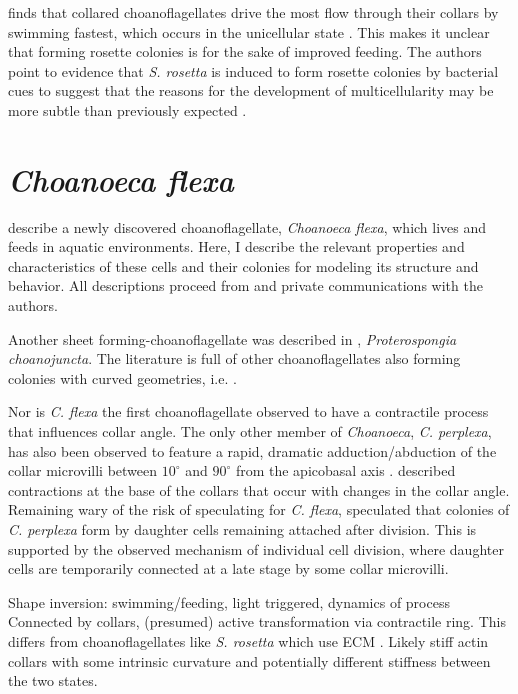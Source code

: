 \citet{kirkegaard2016} finds that collared choanoflagellates drive the most flow through their collars by swimming fastest, which occurs in the unicellular state \citep{michelin2011}. This makes it unclear that forming rosette colonies is for the sake of improved feeding. The authors point to evidence that \textit{S. rosetta} is induced to form rosette colonies by bacterial cues to suggest that the reasons for the development of multicellularity may be more subtle than previously expected \citep{alegado2012}.

\section{\textit{Choanoeca flexa}}  %

\citet{brunet2019} describe a newly discovered choanoflagellate, \textit{Choanoeca flexa}, which lives and feeds in aquatic environments. Here, I describe the relevant properties and characteristics of these cells and their colonies for modeling its structure and behavior. All descriptions proceed from \citet{brunet2019} and private communications with the authors.

Another sheet forming-choanoflagellate was described in \citet{leadbeater1983}, \textit{Proterospongia choanojuncta}. The literature is full of other choanoflagellates also forming colonies with curved geometries, i.e. \citet{lauterborn1898}. 

Nor is \textit{C. flexa} the first choanoflagellate observed to have a contractile process that influences collar angle. The only other member of \textit{Choanoeca}, \textit{C. perplexa}, has also been observed to feature a rapid, dramatic adduction/abduction of the collar microvilli between $10^\circ$ and $90^\circ$ from the apicobasal axis \citep{ellis1930}. \citet{leadbeater1977} described contractions at the base of the collars that occur with changes in the collar angle.
Remaining wary of the risk of speculating for \textit{C. flexa}, \citet{leadbeater1977} speculated that colonies of \textit{C. perplexa} form by daughter cells remaining attached after division. This is supported by the observed mechanism of individual cell division, where daughter cells are temporarily connected at a late stage by some collar microvilli. 

Shape inversion: swimming/feeding, light triggered, dynamics of process
Connected by collars, (presumed) active transformation via contractile ring. This differs from choanoflagellates like \textit{S. rosetta} which use ECM \citep{larson2020}. 
Likely stiff actin collars with some intrinsic curvature and potentially different stiffness between the two states.

